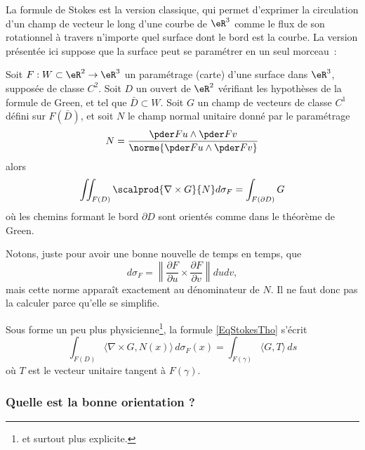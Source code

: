 La formule de Stokes est la version classique, qui permet d'exprimer la circulation d'un champ de vecteur le long d'une courbe de \( \eR^3\) comme le flux de son rotationnel à travers n'importe quel surface dont le bord est la courbe. La version présentée ici suppose que la surface peut se paramétrer en un seul morceau~:
\begin{theorem}
	Soit \( F : W\subset \eR^2 \to \eR^3\) un paramétrage (carte) d'une surface dans \( \eR^3\), supposée de classe \( C^2\). Soit \( D\) un ouvert de \( \eR^2\) vérifiant les hypothèses de la formule de Green, et tel que \( \bar D \subset W\). Soit \( G\) un champ de vecteurs de classe \( C^1\) défini sur \( F(\bar D)\), et soit \( N\) le champ normal unitaire donné par le paramétrage
	\begin{equation}
		N = \frac{\pder F u \wedge \pder F v}{\norme{\pder F u \wedge \pder F v}}
	\end{equation}
	alors
	\begin{equation}\label{EqStokesTho}
		\iint_{F(D)} \scalprod{\nabla\times G}{N} d\sigma_F = \int_{F(\partial D)} G
	\end{equation}
	où les chemins formant le bord \( \partial D\) sont orientés comme dans le théorème de Green.
\end{theorem}
Notons, juste pour avoir une bonne nouvelle de temps en temps, que
\begin{equation}
	d\sigma_F=\left\| \frac{ \partial F }{ \partial u }\times\frac{ \partial F }{ \partial v }  \right\|dudv,
\end{equation}
mais cette norme apparaît exactement au dénominateur de \( N\). Il ne faut donc pas la calculer parce qu'elle se simplifie.

Sous forme un peu plus physicienne\footnote{et surtout plus explicite.}, la formule \eqref{EqStokesTho} s'écrit
\begin{equation}
	\int_{F(D)}\langle \nabla\times G, N(x)\rangle\, d\sigma_F(x)=\int_{F(\gamma)}\langle G, T\rangle\, ds
\end{equation}
où \( T\) est le vecteur unitaire tangent à \( F(\gamma)\).

\subsubsection{Quelle est la bonne orientation ?}

